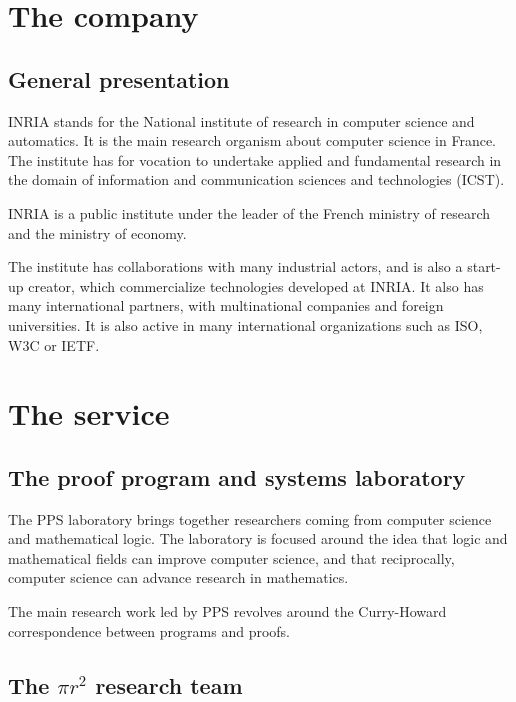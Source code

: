 \documentclass[a4paper, 11pt]{article}
\begin{document}
\newcommand{\pir}[0]{\textbf{$\pi r^2$}\xspace}



\section{The company}
\subsection{General presentation}
INRIA stands for the National institute of research in computer science and
automatics. It is the main research organism about computer science in France.
The institute has for vocation to undertake applied and fundamental research
in the domain of information and communication sciences and technologies (ICST).

INRIA is a public institute under the leader of the French ministry of research
and the ministry of economy.

The institute has collaborations with many industrial actors, and is also
a start-up creator, which commercialize technologies developed at INRIA.
It also has many international partners, with multinational companies and
foreign universities. It is also active in many international organizations
such as ISO, W3C or IETF.

\section{The service}
\subsection{The proof program and systems laboratory}
The PPS laboratory brings together researchers coming from computer science and
mathematical logic. The laboratory is focused around the idea that logic
and mathematical fields can improve computer science, and that reciprocally,
computer science can advance research in mathematics.

The main research work led by PPS revolves around the Curry-Howard correspondence
between programs and proofs.

\subsection{The $\pi r^2$ research team}
\end{document}

